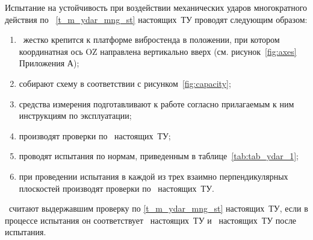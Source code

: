 Испытание на устойчивость при воздействии механических ударов многократного действия по \ \ref{t_m_ydar_mng_st} настоящих~ТУ проводят следующим образом:

\begin{enumerate}
	\item \dut \ жестко крепится к платформе вибростенда в положении, при котором координатная ось OZ направлена вертикально вверх (см. рисунок~\ref{fig:axes} Приложения А);
	\item собирают схему в соответствии с рисунком~\ref{fig:capacity};
	\item средства измерения подготавливают к работе согласно прилагаемым к ним инструкциям по эксплуатации;
	\item производят проверки по \treb \ настоящих~ТУ;
	\item проводят испытания по нормам, приведенным в таблице~\ref{tab:tab_ydar_1};
	\item при проведении испытания в каждой из трех взаимно перпендикулярных плоскостей производят проверки по \treb \ настоящих~ТУ.
\end{enumerate}

\dut \ считают выдержавшим проверку по \ref{t_m_ydar_mng_st} настоящих~ТУ, если в процессе испытания он соответствует \treb \ настоящих~ТУ и \trebafter \ настоящих~ТУ после испытания.
